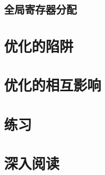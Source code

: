 \documentclass[cn,11pt,chinese]{elegantbook}
\begin{document}
\subsection{全局寄存器分配}

\section{优化的陷阱}

\section{优化的相互影响}

\section{练习}

\section{深入阅读}
\end{document}
